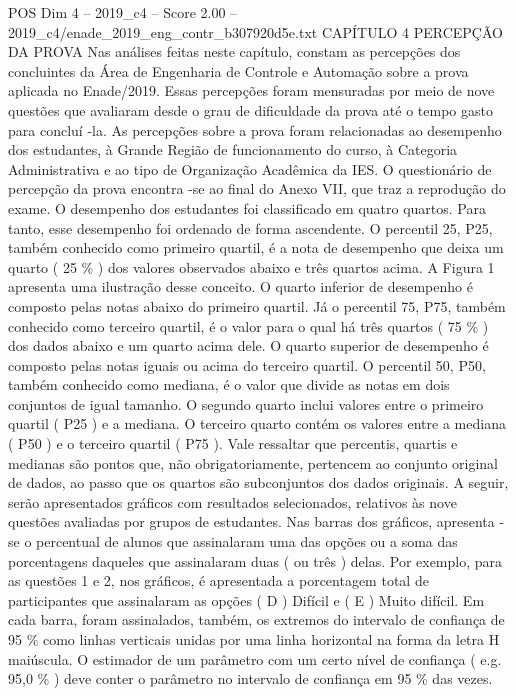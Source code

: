 \begin{textsample}{POS Dim 4 – 2019\_c4 – Score 2.00 – 2019\_c4/enade\_2019\_eng\_contr\_b307920d5e.txt}  \label{ex:f4_pos_115}
CAPÍTULO 4 PERCEPÇÃO DA PROVA Nas análises feitas neste capítulo, constam as percepções dos concluintes da Área de Engenharia de Controle e Automação sobre a prova aplicada no Enade/2019.
Essas percepções foram mensuradas por meio de nove questões que avaliaram desde o grau de dificuldade da prova até o tempo gasto para concluí -la.
As percepções sobre a prova foram relacionadas ao desempenho dos estudantes, à Grande Região de funcionamento do curso, à Categoria Administrativa e ao tipo de Organização Acadêmica da IES.
O questionário de percepção da prova encontra -se ao final do Anexo VII, que traz a reprodução do exame.
O desempenho dos estudantes foi classificado em quatro quartos.
Para tanto, esse desempenho foi ordenado de forma ascendente.
O percentil 25, P25, também conhecido como primeiro quartil, é a nota de desempenho que deixa um quarto ( 25 \% ) dos valores observados abaixo e três quartos acima.
A Figura 1 apresenta uma ilustração desse conceito.
O quarto inferior de desempenho é composto pelas notas abaixo do primeiro quartil.
Já o percentil 75, P75, também conhecido como terceiro quartil, é o valor para o qual há três quartos ( 75 \% ) dos dados abaixo e um quarto acima dele.
O quarto superior de desempenho é composto pelas notas iguais ou acima do terceiro quartil.
O percentil 50, P50, também conhecido como mediana, é o valor que divide as notas em dois conjuntos de igual tamanho.
O segundo quarto inclui valores entre o primeiro quartil ( P25 ) e a mediana.
O terceiro quarto contém os valores entre a mediana ( P50 ) e o terceiro quartil ( P75 ).
Vale ressaltar que percentis, quartis e medianas são pontos que, não obrigatoriamente, pertencem ao conjunto original de dados, ao passo que os quartos são subconjuntos dos dados originais.
A seguir, serão apresentados gráficos com resultados selecionados, relativos às nove questões avaliadas por grupos de estudantes.
Nas barras dos gráficos, apresenta -se o percentual de alunos que assinalaram uma das opções ou a soma das porcentagens daqueles que assinalaram duas ( ou três ) delas.
Por exemplo, para as questões 1 e 2, nos gráficos, é apresentada a porcentagem total de participantes que assinalaram as opções ( D ) Difícil e ( E ) Muito difícil.
Em cada barra, foram assinalados, também, os extremos do intervalo de confiança de 95 \% como linhas verticais unidas por uma linha horizontal na forma da letra H maiúscula.
O estimador de um parâmetro com um certo nível de confiança ( e.g. 95,0 \% ) deve conter o parâmetro no intervalo de confiança em 95 \% das vezes.

\end{textsample}

